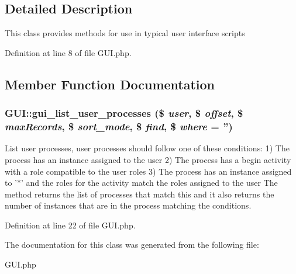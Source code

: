 \subsection{Detailed Description}
This class provides methods for use in typical user interface scripts 



Definition at line 8 of file GUI.php.

\subsection{Member Function Documentation}
\subsubsection{\setlength{\rightskip}{0pt plus 5cm}GUI::gui\_\-list\_\-user\_\-processes (\$ {\em user}, \$ {\em offset}, \$ {\em max\-Records}, \$ {\em sort\_\-mode}, \$ {\em find}, \$ {\em where} = '')}\label{classGUI_a0}


List user processes, user processes should follow one of these conditions: 1) The process has an instance assigned to the user 2) The process has a begin activity with a role compatible to the user roles 3) The process has an instance assigned to '$\ast$' and the roles for the activity match the roles assigned to the user The method returns the list of processes that match this and it also returns the number of instances that are in the process matching the conditions. 

Definition at line 22 of file GUI.php.

The documentation for this class was generated from the following file:\begin{CompactItemize}
\item 
GUI.php\end{CompactItemize}
